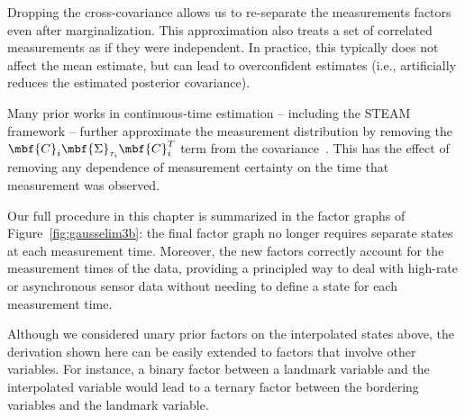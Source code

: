 Dropping the cross-covariance allows us to re-separate the measurements factors even after marginalization. This approximation also treats a set of correlated measurements as if they were independent. In practice, this typically does not affect the mean estimate, but can lead to overconfident estimates (i.e., artificially reduces the estimated posterior covariance).

Many prior works in continuous-time estimation -- including the \ac{STEAM} framework -- further approximate the measurement distribution by removing the $\mbf{C}_i \mbf{\Sigma}_{\tau_i}\mbf{C}_i^T$ term from the covariance~\citep{burnett_tro25}. This has the effect of removing any dependence of measurement certainty on the time that measurement was observed.

Our full procedure in this chapter is summarized in the factor graphs of Figure~\ref{fig:gausselim3b}: the final factor graph no longer requires separate states at each measurement time. Moreover, the new factors correctly account for the measurement times of the data, providing a principled way to deal with high-rate or asynchronous sensor data without needing to define a state for each measurement time. 

Although we considered unary prior factors on the interpolated states above, the derivation shown here can be easily extended to factors that involve other variables. For instance, a binary factor between a landmark variable and the interpolated variable would lead to a ternary factor between the bordering variables and the landmark variable.
